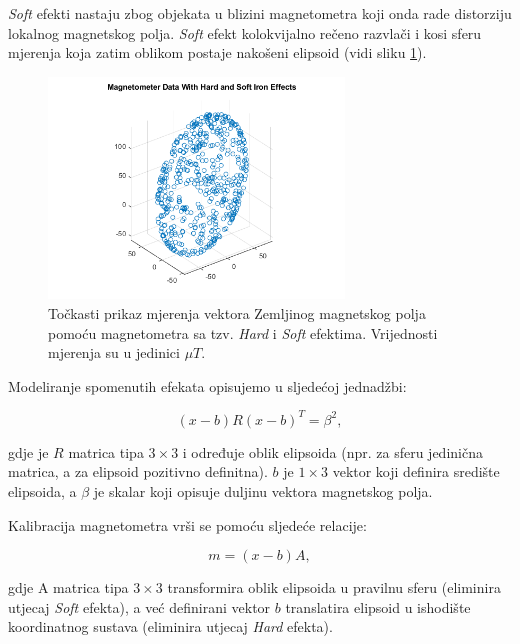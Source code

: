 \documentclass[times, utf8, diplomski, numeric]{templates/template}
\begin{document}
{{{{                \emph{Soft} efekti nastaju zbog objekata u blizini magnetometra koji onda rade distorziju lokalnog magnetskog polja. \emph{Soft} efekt kolokvijalno rečeno razvlači i kosi sferu mjerenja koja zatim oblikom postaje nakošeni elipsoid (vidi sliku \ref{fig:mag_hard_soft}).

                \begin{figure}[htb]
                \centering
                \includegraphics[width=0.7\textwidth]{images/mag_hard_soft.png}
                \caption{Točkasti prikaz mjerenja vektora Zemljinog magnetskog polja pomoću magnetometra sa tzv. \emph{Hard} i \emph{Soft} efektima. Vrijednosti mjerenja su u jedinici $\mu T$.}
                \label{fig:mag_hard_soft}
                \end{figure}

                Modeliranje spomenutih efekata opisujemo u sljedećoj jednadžbi:

                \begin{equation}
                    (x - b)R(x - b)^T = \beta^2,
                \end{equation}

                gdje je $R$ matrica tipa $3\times3$ i određuje oblik elipsoida (npr. za sferu jedinična matrica, a za elipsoid pozitivno definitna). $b$ je $1\times3$ vektor koji definira središte elipsoida, a $\beta$ je skalar koji opisuje duljinu vektora magnetskog polja. 

                Kalibracija magnetometra vrši se pomoću sljedeće relacije:

                \begin{equation}
                    m = (x - b)A,
                \end{equation}

                gdje A matrica tipa $3\times3$ transformira oblik elipsoida u pravilnu sferu (eliminira utjecaj \emph{Soft} efekta), a već definirani vektor $b$ translatira elipsoid u ishodište koordinatnog sustava (eliminira utjecaj \emph{Hard} efekta).

}}}}
\end{document}

